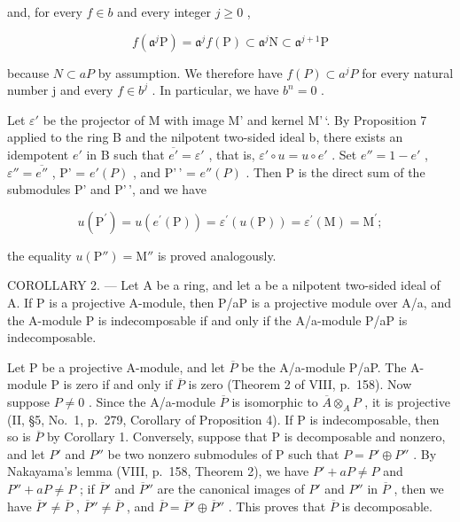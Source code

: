and, for every \(f \in b\) and every integer \(j \geqslant 0\) ,

\[
f (\mathfrak {a} ^ {j} \mathrm{P}) = \mathfrak {a} ^ {j} f (\mathrm{P}) \subset \mathfrak {a} ^ {j} \mathrm{N} \subset \mathfrak {a} ^ {j + 1} \mathrm{P}
\]

because \(N \subset aP\) by assumption. We therefore have \(f(P) \subset a^{j}P\) for every natural number j and every \(f \in b^{j}\) . In particular, we have \(b^{n} = 0\) .

Let \(\varepsilon'\) be the projector of M with image M' and kernel M'\,`. By Proposition 7 applied to the ring B and the nilpotent two-sided ideal b, there exists an idempotent \(e'\) in B such that \(\overline{e'} = \varepsilon'\) , that is, \(\varepsilon' \circ u = u \circ e'\) . Set \(e'' = 1 - e'\) , \(\varepsilon'' = \overline{e''}\) , P' = \(e'(P)\) , and P'\,' = \(e''(P)\) . Then P is the direct sum of the submodules P' and P'\,', and we have

\[
u (\mathrm{P} ^ {\prime}) = u (e ^ {\prime} (\mathrm{P})) = \varepsilon^ {\prime} (u (\mathrm{P})) = \varepsilon^ {\prime} (\mathrm{M}) = \mathrm{M} ^ {\prime};
\]

the equality \(u(\mathrm{P}'') = \mathrm{M}''\) is proved analogously.

COROLLARY 2. --- Let A be a ring, and let a be a nilpotent two-sided ideal of A. If P is a projective A-module, then P/aP is a projective module over A/a, and the A-module P is indecomposable if and only if the A/a-module P/aP is indecomposable.

Let P be a projective A-module, and let \(\overline{P}\) be the A/a-module P/aP. The A-module P is zero if and only if \(\overline{P}\) is zero (Theorem 2 of VIII, p.~158). Now suppose \(P \neq 0\) . Since the A/a-module \(\overline{P}\) is isomorphic to \(\overline{A} \otimes_{A} P\) , it is projective (II, §5, No.~1, p.~279, Corollary of Proposition 4). If P is indecomposable, then so is \(\overline{P}\) by Corollary 1. Conversely, suppose that P is decomposable and nonzero, and let \(P'\) and \(P''\) be two nonzero submodules of P such that \(P = P' \oplus P''\) . By Nakayama's lemma (VIII, p.~158, Theorem 2), we have \(P' + aP \neq P\) and \(P'' + aP \neq P\) ; if \(\overline{P}'\) and \(\overline{P}''\) are the canonical images of \(P'\) and \(P''\) in \(\overline{P}\) , then we have \(\overline{P}' \neq \overline{P}\) , \(\overline{P}'' \neq \overline{P}\) , and \(\overline{P} = \overline{P}' \oplus \overline{P}''\) . This proves that \(\overline{P}\) is decomposable.
